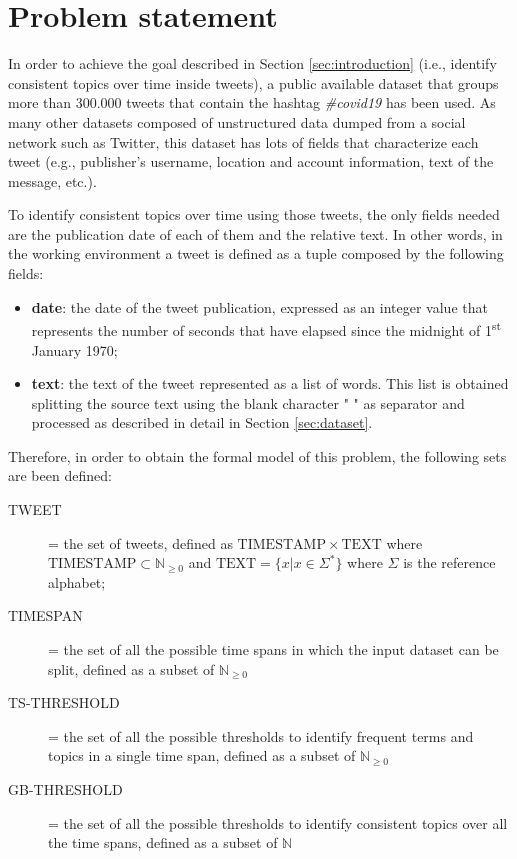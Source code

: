 \section{Problem statement}
\label{sec:problem_statement}
In order to achieve the goal described in Section \ref{sec:introduction} (i.e., identify consistent topics over time inside tweets), a public available dataset that groups more than 300.000 tweets that contain the hashtag \textit{\#covid19} \cite{covid19-tweets-dataset} has been used. As many other datasets composed of unstructured data dumped from a social network such as Twitter, this dataset has lots of fields that characterize each tweet (e.g., publisher's username, location and account information, text of the message, etc.). 

To identify consistent topics over time using those tweets, the only fields needed are the publication date of each of them and the relative text. In other words, in the working environment a tweet is defined as a tuple composed by the following fields:
\begin{itemize}
	\item \textbf{date}: the date of the tweet publication, expressed as an integer value that represents the number of seconds that have elapsed since the midnight of 1\textsuperscript{st} January 1970;
	\item \textbf{text}: the text of the tweet represented as a list of words. This list is obtained splitting the source text using the blank character " " as separator and processed as described in detail in Section \ref{sec:dataset}.
\end{itemize}

Therefore, in order to obtain the formal model of this problem, the following sets are been defined:
\begin{description}
	\item[TWEET] = the set of tweets, defined as $\mathrm{TIMESTAMP} \times \mathrm{TEXT}$ where $\mathrm{TIMESTAMP} \subset \mathbb{N}_{\geq 0}$ and $\mathrm{TEXT} = \{x | x \in \Sigma^*\}$ where $\Sigma$ is the reference alphabet;
	\item[TIMESPAN] = the set of all the possible time spans in which the input dataset can be split, defined as a subset of $\mathbb{N}_{\geq 0}$
	\item[TS-THRESHOLD] = the set of all the possible thresholds to identify frequent terms and topics in a single time span, defined as a subset of $\mathbb{N}_{\geq 0}$
	\item[GB-THRESHOLD] = the set of all the possible thresholds to identify consistent topics over all the time spans, defined as a subset of $\mathbb{N}$
\end{description}


